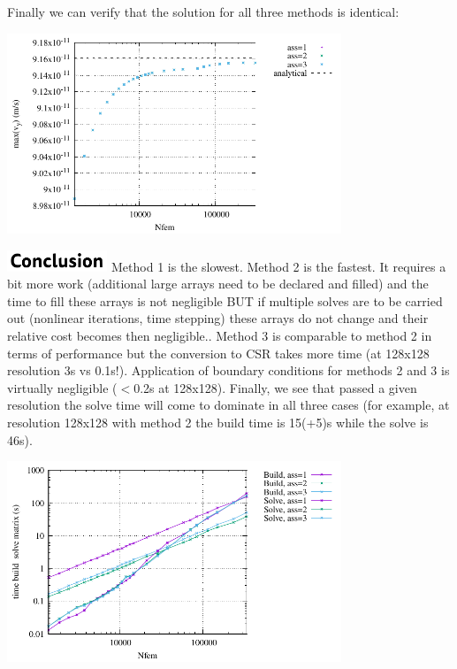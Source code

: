 Finally we can verify that the solution for all three methods is identical:
\begin{center}
\includegraphics[width=10cm]{python_codes/fieldstone_181/RESULTS/vy}
\end{center}




\noindent \includegraphics[width=3cm]{./images/conclusion.png}
Method 1 is the slowest. 
Method 2 is the fastest. It requires a bit more work (additional large arrays need to be 
declared and filled) and the time to fill these arrays is not negligible BUT if 
multiple solves are to be carried out (nonlinear iterations, time stepping) these 
arrays do not change and their relative cost becomes then negligible.. 
Method 3 is comparable to method 2 in terms of performance but the conversion to CSR
takes more time (at 128x128 resolution 3s vs 0.1s!). 
Application of boundary conditions for methods 2 and 3 is virtually negligible ($<$0.2s
at 128x128).
Finally, we see that passed a given resolution the solve time will 
come to dominate in all three cases (for example, at resolution 128x128 with method 2
the build time is 15(+5)s while the solve is 46s). 

\begin{center}
\includegraphics[width=10cm]{python_codes/fieldstone_181/RESULTS/times_build_solve.pdf}
\end{center}


 


